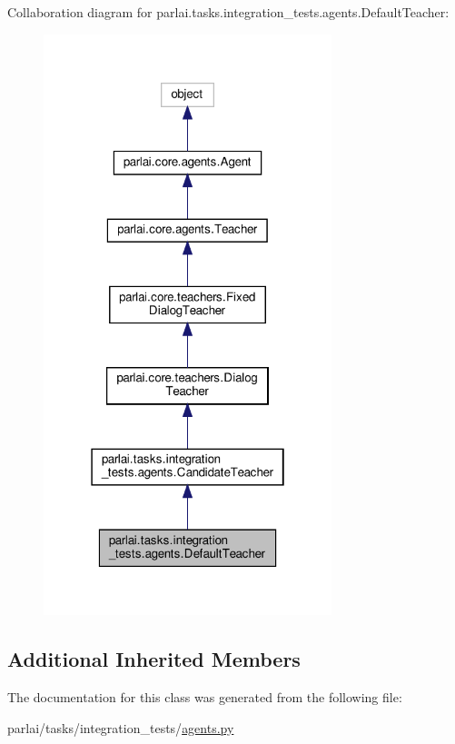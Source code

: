 Collaboration diagram for parlai.\+tasks.\+integration\+\_\+tests.\+agents.\+Default\+Teacher\+:
\nopagebreak
\begin{figure}[H]
\begin{center}
\leavevmode
\includegraphics[width=238pt]{classparlai_1_1tasks_1_1integration__tests_1_1agents_1_1DefaultTeacher__coll__graph}
\end{center}
\end{figure}
\subsection*{Additional Inherited Members}


The documentation for this class was generated from the following file\+:\begin{DoxyCompactItemize}
\item 
parlai/tasks/integration\+\_\+tests/\hyperlink{parlai_2tasks_2integration__tests_2agents_8py}{agents.\+py}\end{DoxyCompactItemize}
